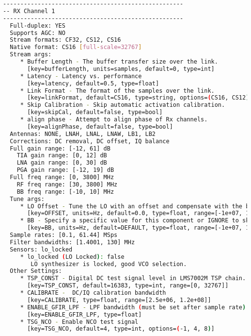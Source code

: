 \begin{appendices}
\begin{lstlisting}[language=bash, caption={SoapySDRUtil Probe Output for LimeSDR}, label={lst: soapyProbe}]
----------------------------------------------------
-- RX Channel 1
----------------------------------------------------
  Full-duplex: YES
  Supports AGC: NO
  Stream formats: CF32, CS12, CS16
  Native format: CS16 [full-scale=32767]
  Stream args:
     * Buffer Length - The buffer transfer size over the link.
       [key=bufferLength, units=samples, default=0, type=int]
     * Latency - Latency vs. performance
       [key=latency, default=0.5, type=float]
     * Link Format - The format of the samples over the link.
       [key=linkFormat, default=CS16, type=string, options=(CS16, CS12)]
     * Skip Calibration - Skip automatic activation calibration.
       [key=skipCal, default=false, type=bool]
     * align phase - Attempt to align phase of Rx channels.
       [key=alignPhase, default=false, type=bool]
  Antennas: NONE, LNAH, LNAL, LNAW, LB1, LB2
  Corrections: DC removal, DC offset, IQ balance
  Full gain range: [-12, 61] dB
    TIA gain range: [0, 12] dB
    LNA gain range: [0, 30] dB
    PGA gain range: [-12, 19] dB
  Full freq range: [0, 3800] MHz
    RF freq range: [30, 3800] MHz
    BB freq range: [-10, 10] MHz
  Tune args:
     * LO Offset - Tune the LO with an offset and compensate with the baseband CORDIC.
       [key=OFFSET, units=Hz, default=0.0, type=float, range=[-1e+07, 1e+07]]
     * BB - Specify a specific value for this component or IGNORE to skip tuning it.
       [key=BB, units=Hz, default=DEFAULT, type=float, range=[-1e+07, 1e+07], options=(DEFAULT, IGNORE)]
  Sample rates: [0.1, 61.44] MSps
  Filter bandwidths: [1.4001, 130] MHz
  Sensors: lo_locked
     * lo_locked (LO Locked): false
        LO synthesizer is locked, good VCO selection.
  Other Settings:
     * TSP_CONST - Digital DC test signal level in LMS7002M TSP chain.
       [key=TSP_CONST, default=16383, type=int, range=[0, 32767]]
     * CALIBRATE -  DC/IQ calibration bandwidth
       [key=CALIBRATE, type=float, range=[2.5e+06, 1.2e+08]]
     * ENABLE_GFIR_LPF - LPF bandwidth (must be set after sample rate)
       [key=ENABLE_GFIR_LPF, type=float]
     * TSG_NCO - Enable NCO test signal
       [key=TSG_NCO, default=4, type=int, options=(-1, 4, 8)]


\end{lstlisting}
\end{appendices}
